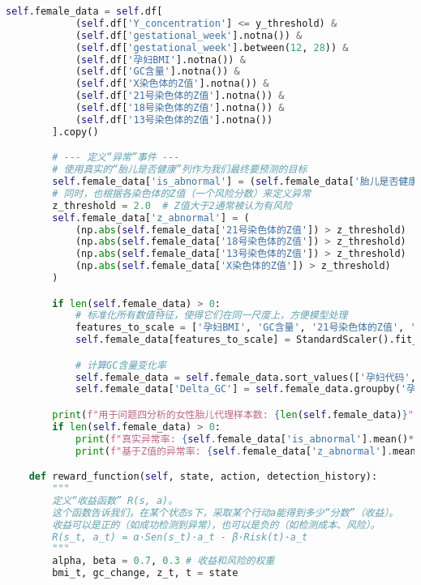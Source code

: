 \documentclass[UTF8, a4paper, 11pt]{ctexart}
\begin{document}
\begin{lstlisting}[language=Python, caption={问题四的解决方案脚本。}]
        self.female_data = self.df[
            (self.df['Y_concentration'] <= y_threshold) &
            (self.df['gestational_week'].notna()) &
            (self.df['gestational_week'].between(12, 28)) &
            (self.df['孕妇BMI'].notna()) &
            (self.df['GC含量'].notna()) &
            (self.df['X染色体的Z值'].notna()) &
            (self.df['21号染色体的Z值'].notna()) &
            (self.df['18号染色体的Z值'].notna()) &
            (self.df['13号染色体的Z值'].notna())
        ].copy()

        # --- 定义“异常”事件 ---
        # 使用真实的“胎儿是否健康”列作为我们最终要预测的目标
        self.female_data['is_abnormal'] = (self.female_data['胎儿是否健康'] == '否')
        # 同时，也根据各染色体的Z值（一个风险分数）来定义异常
        z_threshold = 2.0  # Z值大于2通常被认为有风险
        self.female_data['z_abnormal'] = (
            (np.abs(self.female_data['21号染色体的Z值']) > z_threshold) |
            (np.abs(self.female_data['18号染色体的Z值']) > z_threshold) |
            (np.abs(self.female_data['13号染色体的Z值']) > z_threshold) |
            (np.abs(self.female_data['X染色体的Z值']) > z_threshold)
        )

        if len(self.female_data) > 0:
            # 标准化所有数值特征，使得它们在同一尺度上，方便模型处理
            features_to_scale = ['孕妇BMI', 'GC含量', '21号染色体的Z值', '18号染色体的Z值', '13号染色体的Z值', 'X染色体的Z值']
            self.female_data[features_to_scale] = StandardScaler().fit_transform(self.female_data[features_to_scale])

            # 计算GC含量变化率
            self.female_data = self.female_data.sort_values(['孕妇代码', 'gestational_week'])
            self.female_data['Delta_GC'] = self.female_data.groupby('孕妇代码')['GC含量'].diff().fillna(0)

        print(f"用于问题四分析的女性胎儿代理样本数: {len(self.female_data)}")
        if len(self.female_data) > 0:
            print(f"真实异常率: {self.female_data['is_abnormal'].mean()*100:.2f}%")
            print(f"基于Z值的异常率: {self.female_data['z_abnormal'].mean()*100:.2f}%")

    def reward_function(self, state, action, detection_history):
        """
        定义“收益函数” R(s, a)。
        这个函数告诉我们，在某个状态s下，采取某个行动a能得到多少“分数”（收益）。
        收益可以是正的（如成功检测到异常），也可以是负的（如检测成本、风险）。
        R(s_t, a_t) = α·Sen(s_t)·a_t - β·Risk(t)·a_t
        """
        alpha, beta = 0.7, 0.3 # 收益和风险的权重
        bmi_t, gc_change, z_t, t = state


\end{lstlisting}
\end{document}
